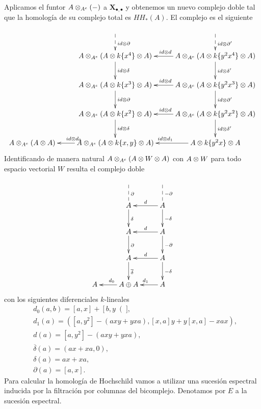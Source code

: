 \documentclass[fleqn,../tesis.tex]{subfiles}
\begin{document}
Aplicamos el funtor $A \otimes_{A^e}(-)$ a $\mathbf{X}_{\bullet,\bullet}$ y obtenemos un nuevo
complejo doble tal que la homología de su complejo total es $HH_*(A)$. El complejo es el siguiente
\begin{align*}
\xymatrix{
	& & \\
	& A \ox_{A^e} (A \ox k\{x^4\} \ox A) \ar[d]^{id\ox\delta} \ar@{<--}[u]_{id\ox\partial}
		& A \ox_{A^e} (A \ox k\{y^2x^4\} \ox A) \ar[l]_{id\ox d} \ar[d]^{id\ox\delta'} \ar@{<--}[u]_{id\ox\partial'} \\
	& A \ox_{A^e} (A \ox k\{x^3\} \ox A) \ar[d]^{id\ox\partial}
		& A \ox_{A^e} (A \ox k\{y^2x^3\} \ox A) \ar[l]_{id\ox d} \ar[d]^{id\ox\partial'} \\
	& A \ox_{A^e} (A \ox k\{x^2\} \ox A) \ar[d]^{id\ox\delta}
		& A \ox_{A^e} (A \ox k \{y^2x^2\} \ox A) \ar[l]_{id\ox d} \ar[d]^{id\ox\delta'} \\
	A \ox_{A^e} (A \ox A) & A \ox_{A^e} (A \ox k\{x, y\} \ox A) \ar[l]_{id\ox d_0} & A \ox k \{y^2x\} \ox A \ar[l]_{id\ox d_1} \\
}
\end{align*}
Identificando de manera natural $A \otimes_{A^e} (A \otimes W \otimes A)$ con $A \otimes W$ para todo espacio vectorial $W$ resulta
el complejo doble
\begin{align*}
\xymatrix{
	& & \\
	& A \ar[d]^{\delta} \ar@{--}[u]_{\partial} & A\ar[l]_{d} \ar[d]^{-\delta} \ar@{--}[u]_{-\partial} \\
	& A \ar[d]^{\partial} & A \ar[l]_{d} \ar[d]^{-\partial} \\
	& A \ar[d]^{\overline{\delta}} & A \ar[l]_{d} \ar[d]^{-\delta} \\
	A & A \oplus A \ar[l]_{d_0} & A \ar[l]_{d_1} \\
}
\end{align*}
con los siguientes diferenciales $k$-lineales
\begin{align*}
&d_0(a,b) = \left[a,x\right] + \left[b,y\right(],\\
&d_1(a) = (\left[a,y^2\right] - (axy + yxa), \left[x,a\right]y + y\left[x,a\right] - xax),\\
&d(a) = \left[a,y^2\right] - (axy + yxa),\\
&\overline{\delta}(a) = (ax + xa, 0),\\
&\delta(a) = ax + xa,\\
&\partial(a) = \left[a, x\right].
\end{align*}
Para calcular la homología de Hochschild vamos a utilizar una sucesión espectral inducida por la filtración por columnas del bicomplejo.
Denotamos por $E$ a la sucesión espectral.
\end{document}
